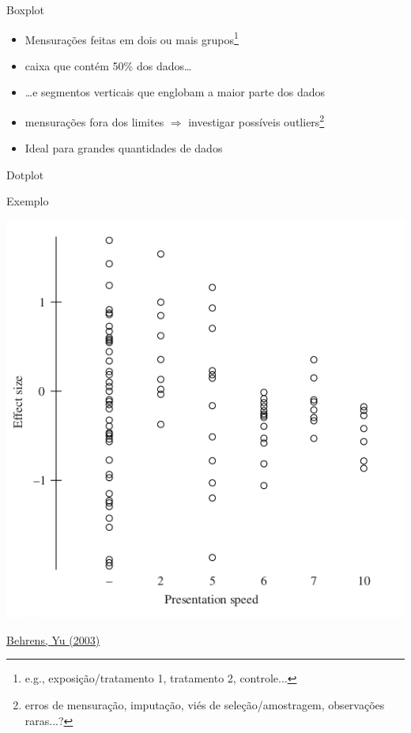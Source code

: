 \documentclass{beamer}
\begin{document}

\begin{frame}{Boxplot}
  \begin{itemize}
    \footnotesize
  \item Mensurações feitas em dois ou mais grupos\footnote{\tiny e.g., exposição/tratamento 1, tratamento 2, controle...}
    \bigskip
  \item caixa que contém 50\% dos dados\ldots
  \item \ldots e segmentos verticais que englobam a maior parte dos
    dados
    \bigskip
  \item mensurações fora dos limites $\Rightarrow$ investigar
    possíveis outliers\footnote{\tiny erros de mensuração, imputação, viés de seleção/amostragem, observações raras...?}
    \bigskip
  \item Ideal para grandes quantidades de dados
  \end{itemize}
\end{frame}

\begin{frame}{Dotplot}
  \begin{exampleblock}{Exemplo}
    \begin{center}
      \includegraphics[height=0.7\textheight]{EDA/eda-boxplot1}
    \end{center}
  \end{exampleblock}

  \vfill
  \scriptsize
  \hfill \href{https://doi.org/10.1002/0471264385.wei0202}
  {Behrens, Yu (2003)}
\end{frame}
\end{document}
